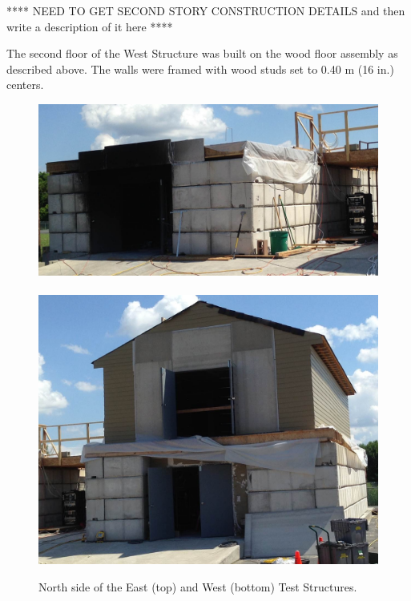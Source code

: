 \documentclass[12pt,oneside]{book}
\begin{document}
**** NEED TO GET SECOND STORY CONSTRUCTION DETAILS and then write a description of it here ****

The second floor of the West Structure was built on the wood floor assembly as described above. The walls were framed with wood studs set to 0.40 m (16 in.) centers.

\begin{figure}[!ht]
\includegraphics[width=6in]{../Pictures/east_structure}
\\~\\
\includegraphics[width=6in]{../Pictures/west_structure}
\caption[North side of the East and West Structures.]{North side of the East (top) and West (bottom) Test Structures.}
\label{fig:struct_pics}
\end{figure}
\end{document}
